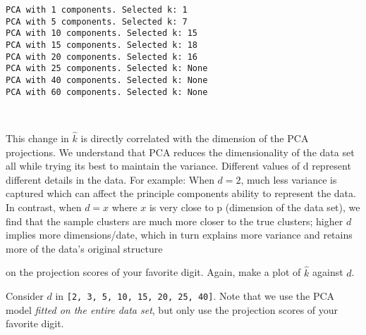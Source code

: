 \documentclass[11pt]{article}
\begin{document}
    \begin{Verbatim}[commandchars=\\\{\}]
PCA with 1 components. Selected k: 1
PCA with 5 components. Selected k: 7
PCA with 10 components. Selected k: 15
PCA with 15 components. Selected k: 18
PCA with 20 components. Selected k: 16
PCA with 25 components. Selected k: None
PCA with 40 components. Selected k: None
PCA with 60 components. Selected k: None
    \end{Verbatim}

    \begin{center}
    \end{center}
    { \hspace*{\fill} \\}
    
    This change in \(\hat{k}\) is directly correlated with the dimension of
the PCA projections. We understand that PCA reduces the dimensionality
of the data set all while trying its best to maintain the variance.
Different values of d represent different details in the data. For
example: When \(d = 2\), much less variance is captured which can affect
the principle components ability to represent the data. In contrast,
when \(d = x\) where \(x\) is very close to p (dimension of the data
set), we find that the sample clusters are much more closer to the true
clusters; higher \(d\) implies more dimensions/date, which in turn
explains more variance and retains more of the data's original structure

    on the projection scores of your favorite digit. Again, make a plot of
\(\hat{k}\) against \(d\).

Consider \(d\) in \texttt{{[}2,\ 3,\ 5,\ 10,\ 15,\ 20,\ 25,\ 40{]}}.
Note that we use the PCA model \emph{fitted on the entire data set}, but
only use the projection scores of your favorite digit.
\end{document}
